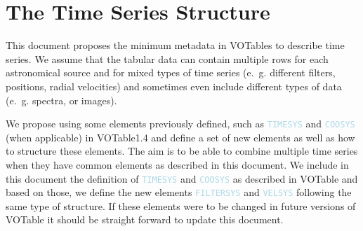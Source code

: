 \documentclass[11pt,a4paper]{ivoa}
\newcommand\elem[1]{\textcolor{LightBlue}{{\tt#1}}}
\begin{document}

\section{The Time Series Structure}
\label{elem:TIMESERIES}
This document proposes the minimum metadata in VOTables to describe time series. We assume that the tabular data can contain multiple rows for each astronomical source and for mixed types of time series (e.~g. different filters, positions, radial velocities) and sometimes even include different types of data (e.~g. spectra, or images). 

We propose using some elements previously defined, such as \elem{TIMESYS} and \elem{COOSYS} (when applicable) in VOTable1.4 \cite{VOTable1.4} and define a set of new elements as well as how to structure these elements. The aim is to be able to combine multiple time series when they have common elements as described in this document. We include in this document the definition of \elem{TIMESYS} and \elem{COOSYS} as described in VOTable and based on those, we define the new elements \elem{FILTERSYS} and \elem{VELSYS} following the same type of structure. If these elements were to be changed in future versions of VOTable it should be straight forward to update this document. 
\end{document}

